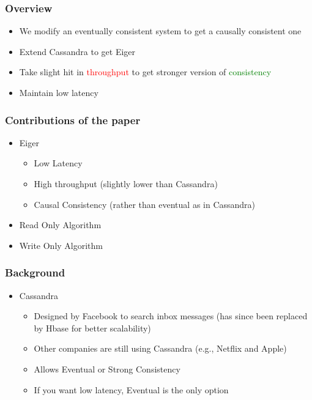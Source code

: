 \documentclass{beamer}
\begin{document}
\begin{frame}
\frametitle{Overview}
\begin{itemize}

\item We modify an eventually consistent system to get a causally consistent one
\item Extend Cassandra to get Eiger
\item Take slight hit in \textcolor{red}{throughput} \newline to get stronger version of \textcolor{green}{consistency}
\item Maintain low latency

\end{itemize}  
\end{frame}

\begin{frame}
\frametitle{Contributions of the paper} 
\begin{itemize}
\item Eiger
	\begin{itemize}
		\item Low Latency
		\item High throughput (slightly lower than Cassandra)
		\item Causal Consistency (rather than eventual as in Cassandra)
	\end{itemize}
\item Read Only Algorithm
\item Write Only Algorithm
\end{itemize}  
\end{frame}

\begin{frame}
\frametitle{Background}
\begin{itemize}
\item Cassandra
	\begin{itemize}
		\item Designed by Facebook to search inbox messages (has since been replaced by Hbase for better scalability)
		\item Other companies are still using Cassandra (e.g., Netflix and Apple)
		\item Allows Eventual or Strong Consistency
		\item If you want low latency, Eventual is the only option
	\end{itemize}
\end{itemize}  
\end{frame}
\end{document}
